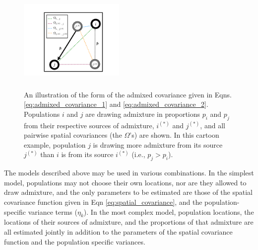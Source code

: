 \documentclass[12pt]{article}
\newcommand{\identifyadmixsource}[1]{{#1^{(*)}}}
\begin{document}
\begin{figure}[ht!]
	\centering
	\includegraphics[width=2in,height=2in]{figs/admix_cov_fig.pdf}
	\caption{An illustration of the form of the admixed covariance given in Eqns. \eqref{eq:admixed_covariance_1} and \eqref{eq:admixed_covariance_2}.  Populations $i$ and $j$ are drawing admixture in proportions $p_i$ and $p_j$ from their respective sources of admixture, $i^{(*)}$ and $j^{(*)}$, and all pairwise spatial covariances (the $\Omega$'s) are shown.  In this cartoon example, population $j$ is drawing more admixture from its source $j^{(*)}$ than $i$ is from its source $i^{(*)}$ (i.e., $p_j > p_i$).}\label{sfig:admixed_cov_diagram}
\end{figure}



The models described above may be used in various combinations.  In the simplest model, populations may not choose their own locations, nor are they allowed to draw admixture, and the only parameters to be estimated are those of the spatial covariance function given in Eqn \eqref{eq:spatial_covariance}, and the population-specific variance terms ($\eta_k$).  In the most complex model, population locations, the locations of their sources of admixture, and the proportions of that admixture are all estimated jointly in addition to the parameters of the spatial covariance function and the population specific variances.  %
\end{document}
